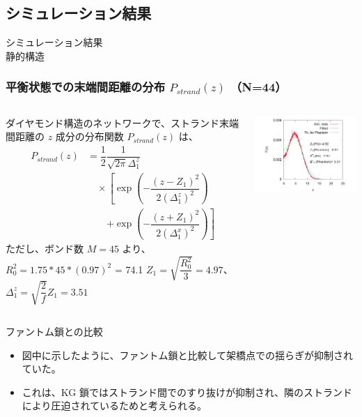 \documentclass[11pt, dvipdfmx]{beamer}
\begin{document}
\subsection{シミュレーション結果}
\begin{frame}
\Large{シミュレーション結果\\静的構造}
\end{frame}
\begin{frame}
\frametitle{平衡状態での末端間距離の分布 $P_{strand}(z)$ （N=44） }

\begin{columns}[totalwidth=1\textwidth]
\footnotesize
ダイヤモンド構造のネットワークで、ストランド末端間距離の $z$ 成分の分布関数 $P_{strand}(z)$ は、
\vspace{-3mm}
\tiny
\begin{align*}
P_{strand}(z) 
&= \dfrac{1}{2}\dfrac{1}{\sqrt{2\pi}\Delta_1^z} \\
&\quad \times \left[ \exp\left(-\dfrac{(z-Z_1)^2}{2(\Delta^z_1)^2} \right) \right. \\
&\quad \quad \left. + \exp\left(-\dfrac{(z+Z_1)^2}{2(\Delta^x_1)^2} \right) \right]
\end{align*}
ただし、ボンド数 $M=45$ より、\\
$R_0^2=1.75*45*(0.97)^2$ = 74.1
$Z_1=\sqrt{\dfrac{R_0^2}{3}} =4.97$、
$\Delta^z_1=\sqrt{\dfrac{2}{f}}Z_1 = 3.51$

\centering
\includegraphics[width=70mm]{./fig/Rz.pdf}
\end{columns}

\scriptsize
\begin{block}{ファントム鎖との比較}
\begin{itemize}
\item
図中に示したように、ファントム鎖と比較して架橋点での揺らぎが抑制されていた。
\item
これは、KG 鎖ではストランド間でのすり抜けが抑制され、隣のストランドにより圧迫されているためと考えられる。
\end{itemize}

\end{block}
\end{frame}
\end{document}
